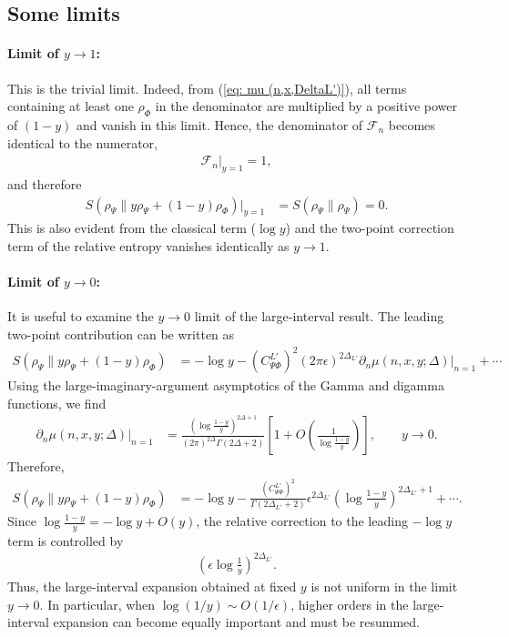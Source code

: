 \documentclass[11pt]{article}
\newcommand{\ep}{\epsilon}
\newcommand{\p}{\partial}
\newcommand{\lb}{\left(}
\newcommand{\rb}{\right)}
\begin{document}
\subsection{Some limits}
\paragraph{Limit of $y\to 1$:} 
This is the trivial limit. Indeed, from (\ref{eq: mu (n,x,DeltaL')}), all terms containing at least one $\rho_\Phi$ in the denominator
are multiplied by a positive power of $(1-y)$ and vanish in this limit. Hence,
the denominator of $\mathcal{F}_n$ becomes identical to the numerator,
\begin{align}
    \mathcal{F}_n\Big|_{y=1}=1,
\end{align}
and therefore
\begin{align}
    S\lb
    \rho_\Psi
    \Big\|
    y\rho_\Psi+(1-y)\rho_\Phi
    \rb\Big|_{y=1}
    &=
    S(\rho_\Psi\|\rho_\Psi)
    =0.
\end{align}
This is also evident from the classical term ($\log y$) and the two-point correction term of the relative entropy vanishes identically as $y\to 1$. 
\paragraph{Limit of $y\to0$:}

It is useful to examine the $y\to0$ limit of the large-interval result.
The leading two-point contribution can be written as
\begin{align}
    S\lb
    \rho_\Psi
    \Big\|
    y\rho_\Psi+(1-y)\rho_\Phi
    \rb
    &=
    -\log y
    -
    {(C_{\Psi\Phi}^{L'})}^2
    (2\pi\ep)^{2\Delta_{L'}}
    \p_n\mu(n,x,y;\Delta)\Big|_{n=1}
    +\cdots
\end{align}
Using the large-imaginary-argument asymptotics of the Gamma and digamma
functions, we find
\begin{align}
    \p_n\mu(n,x,y;\Delta)\Big|_{n=1}
    &=
    \frac{
    \lb \log \frac{1-y}{y} \rb ^{2\Delta+1}
    }{
    (2\pi)^{2\Delta}
    \Gamma(2\Delta+2)
    }
    \left[
    1+O\lb\frac1{\log \frac{1-y}{y}}\rb
    \right],
    \qquad
    y\to0 .
\end{align}
Therefore,
\begin{align}
    S\lb
    \rho_\Psi
    \Big\|
    y\rho_\Psi+(1-y)\rho_\Phi
    \rb
    &=
    -\log y
    -
    \frac{
    {(C_{\Psi\Phi}^{L'})}^2
    }{
    \Gamma(2\Delta_{L'}+2)
    }
    \ep^{2\Delta_{L'}}
    \lb \log \frac{1-y}{y}\rb^{2\Delta_{L'}+1}
    +\cdots .
\end{align}
Since $\log \frac{1-y}{y}=-\log y+O(y)$, the relative correction to the leading
$-\log y$ term is controlled by
\begin{align}
    \lb
    \ep\log\frac1y
    \rb^{2\Delta_{L'}}.
\end{align}
Thus, the large-interval expansion obtained at fixed $y$ is not uniform
in the limit $y\to0$. In particular, when
$\log(1/y)\sim O(1/\ep)$, higher orders in the large-interval expansion
can become equally important and must be resummed.
\end{document}
